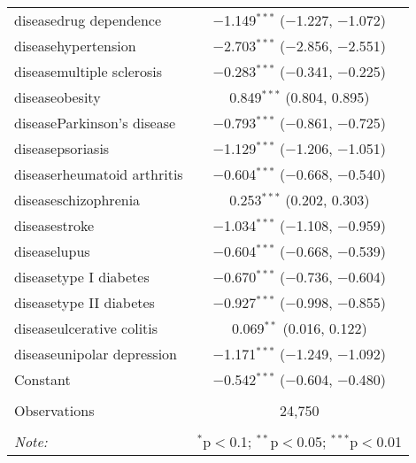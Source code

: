 \begin{table}[!htbp]
\begin{tabular}{@{\extracolsep{5pt}}lc}
  diseasedrug dependence & $-$1.149$^{***}$ ($-$1.227, $-$1.072) \\ 
  diseasehypertension & $-$2.703$^{***}$ ($-$2.856, $-$2.551) \\ 
  diseasemultiple sclerosis & $-$0.283$^{***}$ ($-$0.341, $-$0.225) \\ 
  diseaseobesity & 0.849$^{***}$ (0.804, 0.895) \\ 
  diseaseParkinson's disease & $-$0.793$^{***}$ ($-$0.861, $-$0.725) \\ 
  diseasepsoriasis & $-$1.129$^{***}$ ($-$1.206, $-$1.051) \\ 
  diseaserheumatoid arthritis & $-$0.604$^{***}$ ($-$0.668, $-$0.540) \\ 
  diseaseschizophrenia & 0.253$^{***}$ (0.202, 0.303) \\ 
  diseasestroke & $-$1.034$^{***}$ ($-$1.108, $-$0.959) \\ 
  diseaselupus & $-$0.604$^{***}$ ($-$0.668, $-$0.539) \\ 
  diseasetype I diabetes & $-$0.670$^{***}$ ($-$0.736, $-$0.604) \\ 
  diseasetype II diabetes & $-$0.927$^{***}$ ($-$0.998, $-$0.855) \\ 
  diseaseulcerative colitis & 0.069$^{**}$ (0.016, 0.122) \\ 
  diseaseunipolar depression & $-$1.171$^{***}$ ($-$1.249, $-$1.092) \\ 
  Constant & $-$0.542$^{***}$ ($-$0.604, $-$0.480) \\ 
 \hline \\[-1.8ex] 
Observations & 24,750 \\ 
\hline 
\hline \\[-1.8ex] 
\textit{Note:}  & \multicolumn{1}{r}{$^{*}$p$<$0.1; $^{**}$p$<$0.05; $^{***}$p$<$0.01} \\ 
\end{tabular} 
\end{table} 
